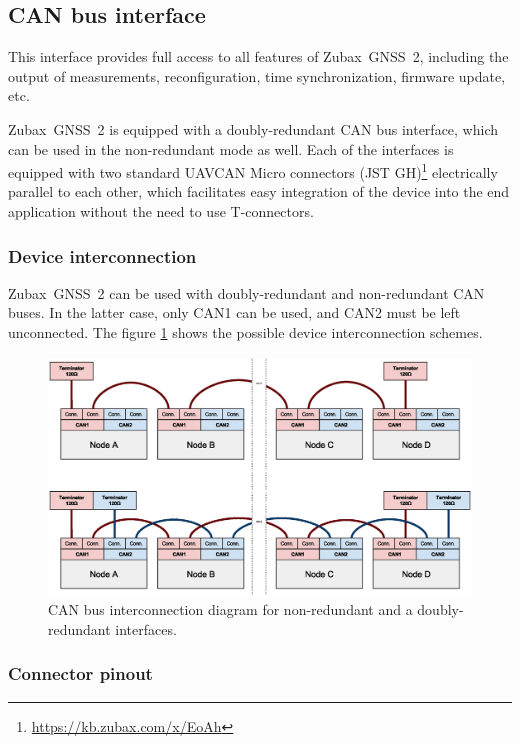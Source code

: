 \documentclass{zubaxdoc}
\begin{document}
\subsection{CAN bus interface}

This interface provides full access to all features of Zubax~GNSS~2, including the output of measurements,
reconfiguration, time synchronization, firmware update, etc.

Zubax~GNSS~2 is equipped with a doubly-redundant CAN bus interface, which can be used in the non-redundant mode
as well.
Each of the interfaces is equipped with two standard
UAVCAN Micro connectors (JST GH)\footnote{\url{https://kb.zubax.com/x/EoAh}}
electrically parallel to each other,
which facilitates easy integration of the device into the end application without the need to use T-connectors.

\subsubsection{Device interconnection}

Zubax~GNSS~2 can be used with doubly-redundant and non-redundant CAN buses.
In the latter case, only CAN1 can be used, and CAN2 must be left unconnected.
The figure \ref{can_daisy_chain} shows the possible device interconnection schemes.

\begin{figure}[hbt]
    \center
	\includegraphics[width=1\textwidth]{can_daisy_chain}
	\caption{CAN bus interconnection diagram for non-redundant and a doubly-redundant interfaces.
	\label{can_daisy_chain}}
\end{figure}

\subsubsection{Connector pinout}
\end{document}
